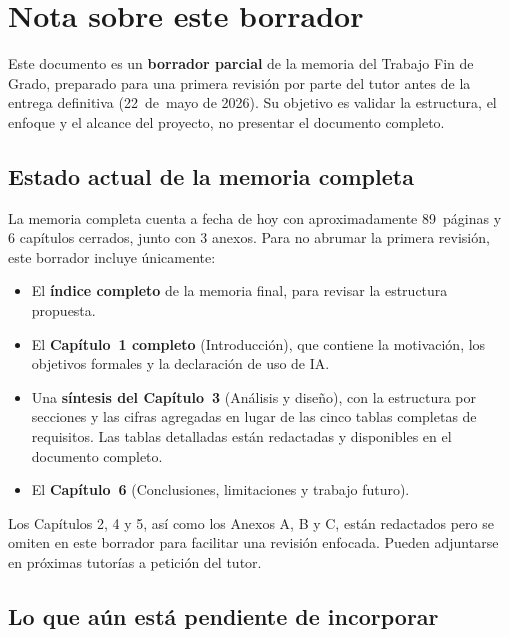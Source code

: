 \chapter*{Nota sobre este borrador}

Este documento es un \textbf{borrador parcial} de la memoria del Trabajo Fin de Grado, preparado para una primera revisión por parte del tutor antes de la entrega definitiva (22~de~mayo de 2026). Su objetivo es validar la estructura, el enfoque y el alcance del proyecto, no presentar el documento completo.

\section*{Estado actual de la memoria completa}

La memoria completa cuenta a fecha de hoy con aproximadamente 89~páginas y 6 capítulos cerrados, junto con 3 anexos. Para no abrumar la primera revisión, este borrador incluye únicamente:

\begin{itemize}[leftmargin=1.2cm, itemsep=2pt]
  \item El \textbf{índice completo} de la memoria final, para revisar la estructura propuesta.
  \item El \textbf{Capítulo~1 completo} (Introducción), que contiene la motivación, los objetivos formales y la declaración de uso de IA.
  \item Una \textbf{síntesis del Capítulo~3} (Análisis y diseño), con la estructura por secciones y las cifras agregadas en lugar de las cinco tablas completas de requisitos. Las tablas detalladas están redactadas y disponibles en el documento completo.
  \item El \textbf{Capítulo~6} (Conclusiones, limitaciones y trabajo futuro).
\end{itemize}

Los Capítulos 2, 4 y 5, así como los Anexos A, B y C, están redactados pero se omiten en este borrador para facilitar una revisión enfocada. Pueden adjuntarse en próximas tutorías a petición del tutor.


\section*{Lo que aún está pendiente de incorporar}

